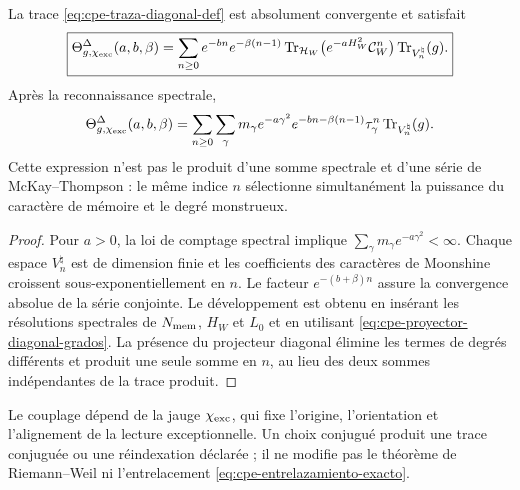 \begin{theorem}
\label{thm:cpe-traza-diagonal}
La trace \eqref{eq:cpe-traza-diagonal-def} est absolument convergente et
satisfait
\begin{equation}
 \boxed{\Theta^{\Delta}_{g,\chi_{\rm exc}}(a,b,\beta)
 =\sum_{n\ge0}e^{-bn}e^{-\beta(n-1)}
 \operatorname{Tr}_{\mathcal H_W}
 \bigl(e^{-aH_W^2}\mathcal C_W^n\bigr)
 \operatorname{Tr}_{V^\natural_n}(g).}
 \label{eq:cpe-traza-diagonal-expansion}
\end{equation}
Après la reconnaissance spectrale,
\begin{equation}
 \Theta^{\Delta}_{g,\chi_{\rm exc}}(a,b,\beta)
 =\sum_{n\ge0}\sum_\gamma
 m_\gamma e^{-a\gamma^2}
 e^{-bn-\beta(n-1)}\tau_\gamma^n
 \operatorname{Tr}_{V^\natural_n}(g).
 \label{eq:cpe-traza-diagonal-espectral}
\end{equation}
Cette expression n'est pas le produit d'une somme spectrale et d'une série de
McKay--Thompson : le même indice \(n\) sélectionne simultanément la puissance
du caractère de mémoire et le degré monstrueux.
\end{theorem}

\begin{proof}
Pour \(a>0\), la loi de comptage spectral implique
\(\sum_\gamma m_\gamma e^{-a\gamma^2}<\infty\). Chaque espace
\(V^\natural_n\) est de dimension finie et les coefficients des caractères
de Moonshine croissent sous-exponentiellement en \(n\). Le facteur
\(e^{-(b+\beta)n}\) assure la convergence absolue de la série conjointe.
Le développement est obtenu en insérant les résolutions spectrales de
\(N_{\rm mem}\), \(H_W\) et \(L_0\) et en utilisant
\eqref{eq:cpe-proyector-diagonal-grados}. La présence du projecteur diagonal
élimine les termes de degrés différents et produit une seule somme en
\(n\), au lieu des deux sommes indépendantes de la trace produit.
\end{proof}

Le couplage dépend de la jauge \(\chi_{\rm exc}\), qui fixe l'origine,
l'orientation et l'alignement de la lecture exceptionnelle. Un choix conjugué
produit une trace conjuguée ou une réindexation déclarée ; il ne modifie pas le
théorème de Riemann--Weil ni l'entrelacement
\eqref{eq:cpe-entrelazamiento-exacto}.


